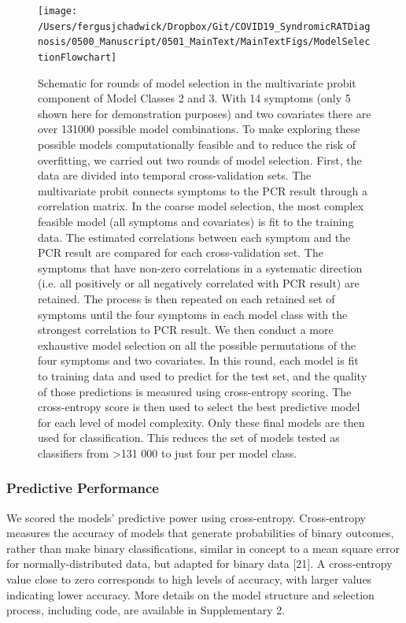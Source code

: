 \documentclass[]{elsarticle} %
\begin{document}
\begin{figure}
\texttt{[image: /Users/fergusjchadwick/Dropbox/Git/COVID19\_SyndromicRATDiagnosis/0500\_Manuscript/0501\_MainText/MainTextFigs/ModelSelectionFlowchart]} \caption{Schematic for rounds of model selection in the multivariate probit component of Model Classes 2 and 3. With 14 symptoms (only 5 shown here for demonstration purposes) and two covariates there are over 131000 possible model combinations. To make exploring these possible models computationally feasible and to reduce the risk of overfitting, we carried out two rounds of model selection. First, the data are divided into temporal cross-validation sets. The multivariate probit connects symptoms to the PCR result through a correlation matrix. In the coarse model selection, the most complex feasible model (all symptoms and covariates) is fit to the training data. The estimated correlations between each symptom and the PCR result are compared for each cross-validation set. The symptoms that have non-zero correlations in a systematic direction (i.e. all positively or all negatively correlated with PCR result) are retained. The process is then repeated on each retained set of symptoms until the four symptoms in each model class with the strongest correlation to PCR result. We then conduct a more exhaustive model selection on all the possible permutations of the four symptoms and two covariates. In this round, each model is fit to training data and used to predict for the test set, and the quality of those predictions is measured using cross-entropy scoring. The cross-entropy score is then used to select the best predictive model for each level of model complexity. Only these final models are then used for classification. This reduces the set of models tested as classifiers from >131 000 to just four per model class.}\label{fig:modsel-flowchart}
\end{figure}

\hypertarget{predictive-performance}{%
\subsubsection{Predictive Performance}\label{predictive-performance}}

We scored the models' predictive power using cross-entropy.
Cross-entropy measures the accuracy of models that generate probabilities of binary outcomes, rather than make binary classifications, similar in concept to a mean square error for normally-distributed data, but adapted for binary data {[}21{]}.
A cross-entropy value close to zero corresponds to high levels of accuracy, with larger values indicating lower accuracy.
More details on the model structure and selection process, including code, are available in Supplementary 2.
\end{document}
